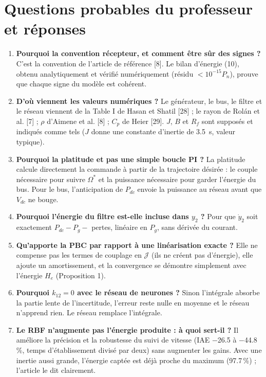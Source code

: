 \documentclass[11pt,a4paper]{article}
\newcommand{\Jm}{\boldsymbol{\mathcal{J}}}
\begin{document}
\section{Questions probables du professeur et réponses}
\begin{enumerate}[itemsep=5pt,leftmargin=*]
\item \textbf{Pourquoi la convention récepteur, et comment être sûr des signes ?}
C'est la convention de l'article de référence [8]. Le bilan d'énergie (10), obtenu analytiquement et
vérifié numériquement (résidu $<10^{-15}P_n$), prouve que chaque signe du modèle est cohérent.

\item \textbf{D'où viennent les valeurs numériques ?}
Le générateur, le bus, le filtre et le réseau viennent de la Table I de Hasan et Shatil [28] ; le rayon de
Rolán et al. [7] ; $\rho$ d'Aimene et al. [8] ; $C_p$ de Heier [29]. $J$, $B$ et $R_f$ sont supposés et
indiqués comme tels ($J$ donne une constante d'inertie de 3.5~s, valeur typique).

\item \textbf{Pourquoi la platitude et pas une simple boucle PI ?}
La platitude calcule directement la commande à partir de la trajectoire désirée : le couple nécessaire
pour suivre $\Omega^*$ et la puissance nécessaire pour garder l'énergie du bus. Pour le bus, l'anticipation
de $P_{dc}$ envoie la puissance au réseau avant que $V_{dc}$ ne bouge.

\item \textbf{Pourquoi l'énergie du filtre est-elle incluse dans $y_2$ ?}
Pour que $\dot y_2$ soit exactement $P_{dc}-P_g-$ pertes, linéaire en $P_g$, sans dérivée du courant.

\item \textbf{Qu'apporte la PBC par rapport à une linéarisation exacte ?}
Elle ne compense pas les termes de couplage en $\Jm$ (ils ne créent pas d'énergie), elle ajoute un
amortissement, et la convergence se démontre simplement avec l'énergie $H_e$ (Proposition 1).

\item \textbf{Pourquoi $k_{12}=0$ avec le réseau de neurones ?}
Sinon l'intégrale absorbe la partie lente de l'incertitude, l'erreur reste nulle en moyenne et le réseau
n'apprend rien. Le réseau remplace l'intégrale.

\item \textbf{Le RBF n'augmente pas l'énergie produite : à quoi sert-il ?}
Il améliore la précision et la robustesse du suivi de vitesse (IAE $-$26.5 à $-$44.8\,\%, temps
d'établissement divisé par deux) sans augmenter les gains. Avec une inertie aussi grande, l'énergie captée
est déjà proche du maximum (97.7\,\%) ; l'article le dit clairement.


\end{enumerate}
\end{document}
